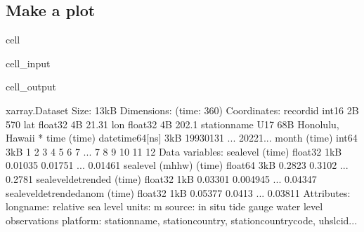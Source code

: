 \documentclass[letterpaper,10pt,english]{jupyterBook}
\begin{document}
\subsection{Make a plot}
\label{\detokenize{notebooks/regional_and_local/SL_anomaly_intra-annual:make-a-plot}}
\begin{sphinxuseclass}{cell}\begin{sphinxVerbatimInput}

\begin{sphinxuseclass}{cell_input}
\begin{sphinxVerbatim}[commandchars=\\\{\}]
\end{sphinxVerbatim}

\end{sphinxuseclass}\end{sphinxVerbatimInput}
\begin{sphinxVerbatimOutput}

\begin{sphinxuseclass}{cell_output}
\begin{sphinxVerbatim}[commandchars=\\\{\}]
\PYGZlt{}xarray.Dataset\PYGZgt{} Size: 13kB
Dimensions:                   (time: 360)
Coordinates:
    record\PYGZus{}id                 int16 2B 570
    lat                       float32 4B 21.31
    lon                       float32 4B 202.1
    station\PYGZus{}name              \PYGZlt{}U17 68B \PYGZsq{}Honolulu, Hawaii\PYGZsq{}
  * time                      (time) datetime64[ns] 3kB 1993\PYGZhy{}01\PYGZhy{}31 ... 2022\PYGZhy{}1...
    month                     (time) int64 3kB 1 2 3 4 5 6 7 ... 7 8 9 10 11 12
Data variables:
    sea\PYGZus{}level                 (time) float32 1kB 0.01035 \PYGZhy{}0.01751 ... 0.01461
    sea\PYGZus{}level (mhhw)          (time) float64 3kB \PYGZhy{}0.2823 \PYGZhy{}0.3102 ... \PYGZhy{}0.2781
    sea\PYGZus{}level\PYGZus{}detrended       (time) float32 1kB 0.03301 0.004945 ... \PYGZhy{}0.04347
    sea\PYGZus{}level\PYGZus{}detrended\PYGZus{}anom  (time) float32 1kB 0.05377 0.0413 ... \PYGZhy{}0.03811
Attributes:
    long\PYGZus{}name:  relative sea level
    units:      m
    source:     in situ tide gauge water level observations
    platform:   station\PYGZus{}name, station\PYGZus{}country, station\PYGZus{}country\PYGZus{}code, uhslc\PYGZus{}id...
\end{sphinxVerbatim}

\end{sphinxuseclass}\end{sphinxVerbatimOutput}

\end{sphinxuseclass}
\end{document}
